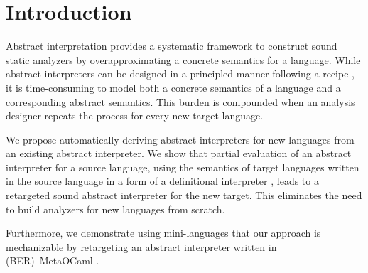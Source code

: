 \documentclass[sigplan,screen]{acmart}
\begin{document}


\begin{abstract}
Implementing sound static analyzers for new languages requires significant time and effort.
We show that it is possible by partial evaluation to automatically retarget existing abstract interpreters for new languages.
Given an existing abstract interpreter for a source language and a definitional interpreter for a new target language, we can derive a correct abstract interpreter for the target language by partially evaluating the abstract interpreter with respect to the definitional interpreter.
We demonstrate our method on mini-languages and show that it is possible to mechanize the process with MetaOCaml.
Our approach suggests a promising direction to reduce the burden of building new analyzers from scratch.
\end{abstract}


\maketitle

\section{Introduction}\label{sec:prob}
Abstract interpretation \citep{CouCou77Abstract} provides a systematic framework to construct sound static analyzers by overapproximating a concrete semantics for a language.
While abstract interpreters can be designed in a principled manner following a recipe \citep{RivYi20Introduction}, it is time-consuming to model both a concrete semantics of a language and a corresponding abstract semantics.
This burden is compounded when an analysis designer repeats the process for every new target language.

We propose automatically deriving abstract interpreters for new languages from an existing abstract interpreter.
We show that partial evaluation \citep{Fut71Partial,Fut99Partial} of an abstract interpreter for a source language, using the semantics of target languages written in the source language in a form of a definitional interpreter \citep{Rey72Definitional}, leads to a retargeted sound abstract interpreter for the new target.
This eliminates the need to build analyzers for new languages from scratch.

Furthermore, we demonstrate using mini-languages that our approach is mechanizable by retargeting an abstract interpreter written in (BER)~MetaOCaml \citep{CalTahHuaLer03Implementing,Ole14Design}.
\end{document}
